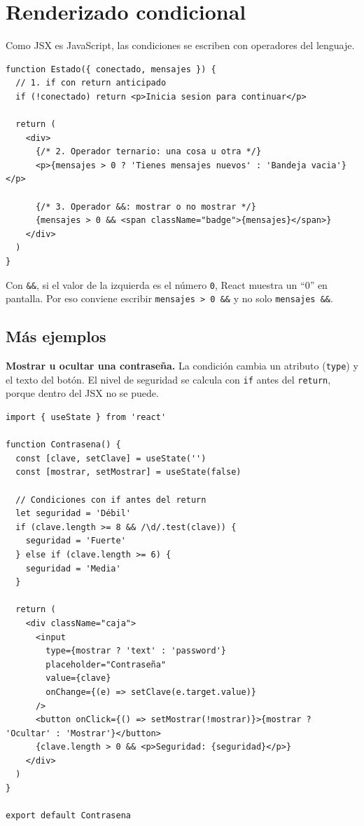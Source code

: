 \documentclass[11pt,a4paper]{article}
\newcommand{\cmd}[1]{\texttt{\color{reactdark}#1}}
\begin{document}
\section{Renderizado condicional}

Como JSX es JavaScript, las condiciones se escriben con operadores del lenguaje.

\begin{lstlisting}[language=JSX]
function Estado({ conectado, mensajes }) {
  // 1. if con return anticipado
  if (!conectado) return <p>Inicia sesion para continuar</p>

  return (
    <div>
      {/* 2. Operador ternario: una cosa u otra */}
      <p>{mensajes > 0 ? 'Tienes mensajes nuevos' : 'Bandeja vacia'}</p>

      {/* 3. Operador &&: mostrar o no mostrar */}
      {mensajes > 0 && <span className="badge">{mensajes}</span>}
    </div>
  )
}
\end{lstlisting}

\begin{atencion}
Con \cmd{\&\&}, si el valor de la izquierda es el número \cmd{0}, React muestra un ``0'' en pantalla. Por eso conviene escribir \cmd{mensajes > 0 \&\&} y no solo \cmd{mensajes \&\&}.
\end{atencion}

\subsection{Más ejemplos}

\textbf{Mostrar u ocultar una contraseña.} La condición cambia un atributo (\cmd{type}) y el texto del botón. El nivel de seguridad se calcula con \cmd{if} antes del \cmd{return}, porque dentro del JSX no se puede.

\begin{lstlisting}[language=JSX,title={\small\ttfamily src/components/condicional/Contrasena.jsx}]
import { useState } from 'react'

function Contrasena() {
  const [clave, setClave] = useState('')
  const [mostrar, setMostrar] = useState(false)

  // Condiciones con if antes del return
  let seguridad = 'Débil'
  if (clave.length >= 8 && /\d/.test(clave)) {
    seguridad = 'Fuerte'
  } else if (clave.length >= 6) {
    seguridad = 'Media'
  }

  return (
    <div className="caja">
      <input
        type={mostrar ? 'text' : 'password'}
        placeholder="Contraseña"
        value={clave}
        onChange={(e) => setClave(e.target.value)}
      />
      <button onClick={() => setMostrar(!mostrar)}>{mostrar ? 'Ocultar' : 'Mostrar'}</button>
      {clave.length > 0 && <p>Seguridad: {seguridad}</p>}
    </div>
  )
}

export default Contrasena
\end{lstlisting}
\end{document}
